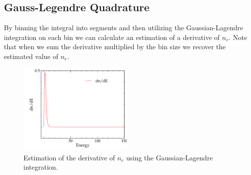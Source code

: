 \documentclass[11pt,letterpaper]{article}
\begin{document}
\subsection{Gauss-Legendre Quadrature}

By binning the integral into segments and then utilizing the
Gaussian-Lagendre integration on each bin we can calculate an estimation of a
derivative of $n_e$. Note that when we sum the derivative multiplied by the
bin size we recover the estimated value of $n_e$.

\begin{figure}[bth]
\centering
\includegraphics[width=0.5\textwidth]{2b.pdf}
\caption{Estimation of the derivative of $n_e$ using the Gaussian-Lagendre
           integration.}
\label{fig:dne}
\end{figure}
\end{document}
